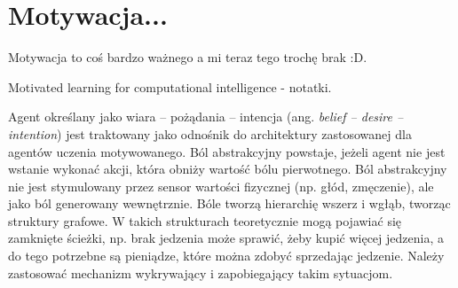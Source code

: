 \chapter{Motywacja...}
\label{cha:rozdzial2}

Motywacja to coś bardzo ważnego a mi teraz tego trochę brak :D.

Motivated learning for computational intelligence - notatki.

Agent określany jako wiara -- pożądania -- intencja (ang. \textit{belief -- 
desire -- intention}) jest traktowany jako odnośnik do architektury zastosowanej 
dla agentów uczenia motywowanego.
Ból abstrakcyjny powstaje, jeżeli agent nie jest wstanie wykonać akcji, która
obniży wartość bólu pierwotnego.
Ból abstrakcyjny nie jest stymulowany przez sensor wartości fizycznej (np. głód, 
zmęczenie), ale jako ból generowany wewnętrznie.
Bóle tworzą hierarchię wszerz i wgłąb, tworząc struktury grafowe. 
W takich strukturach teoretycznie mogą pojawiać się zamknięte ścieżki, np. brak
jedzenia może sprawić, żeby kupić więcej jedzenia, a do tego potrzebne są 
pieniądze, które można zdobyć sprzedając jedzenie.
Należy zastosować mechanizm wykrywający i zapobiegający takim sytuacjom.

